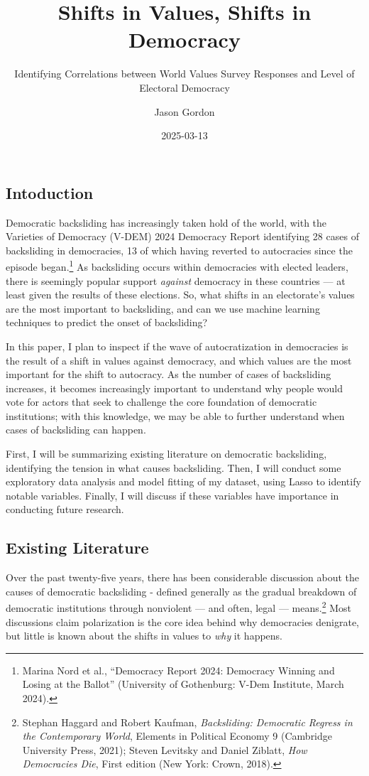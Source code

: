 \documentclass[
  letterpaper,
  DIV=11,
  numbers=noendperiod]{scrartcl}
\title{Shifts in Values, Shifts in Democracy}
\subtitle{Identifying Correlations between World Values Survey Responses
and Level of Electoral Democracy}
\author{Jason Gordon}
\date{2025-03-13}
\begin{document}
\maketitle


\newpage

\subsection{Intoduction}\label{intoduction}

Democratic backsliding has increasingly taken hold of the world, with
the Varieties of Democracy (V-DEM) 2024 Democracy Report identifying 28
cases of backsliding in democracies, 13 of which having reverted to
autocracies since the episode began.\footnote{Marina Nord et al.,
  {``Democracy {Report} 2024: {Democracy Winning} and {Losing} at the
  {Ballot}''} (University of Gothenburg: V-Dem Institute, March 2024).}
As backsliding occurs within democracies with elected leaders, there is
seemingly popular support \emph{against} democracy in these countries
--- at least given the results of these elections. So, what shifts in an
electorate's values are the most important to backsliding, and can we
use machine learning techniques to predict the onset of backsliding?

In this paper, I plan to inspect if the wave of autocratization in
democracies is the result of a shift in values against democracy, and
which values are the most important for the shift to autocracy. As the
number of cases of backsliding increases, it becomes increasingly
important to understand why people would vote for actors that seek to
challenge the core foundation of democratic institutions; with this
knowledge, we may be able to further understand when cases of
backsliding can happen.

First, I will be summarizing existing literature on democratic
backsliding, identifying the tension in what causes backsliding. Then, I
will conduct some exploratory data analysis and model fitting of my
dataset, using Lasso to identify notable variables. Finally, I will
discuss if these variables have importance in conducting future
research.

\subsection{Existing Literature}\label{existing-literature}

Over the past twenty-five years, there has been considerable discussion
about the causes of democratic backsliding - defined generally as the
gradual breakdown of democratic institutions through nonviolent --- and
often, legal --- means.\footnote{Stephan Haggard and Robert Kaufman,
  \emph{Backsliding: {Democratic Regress} in the {Contemporary World}},
  Elements in {Political Economy} 9 (Cambridge University Press, 2021);
  Steven Levitsky and Daniel Ziblatt, \emph{How {Democracies Die}},
  First edition (New York: Crown, 2018).} Most discussions claim
polarization is the core idea behind why democracies denigrate, but
little is known about the shifts in values to \emph{why} it happens.
\end{document}
